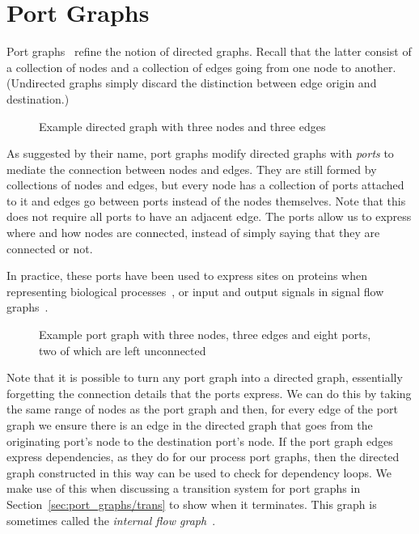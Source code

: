 \documentclass[class=smolathesis,crop=false]{standalone}
\begin{document}
\section{Port Graphs}
\label{sec:port_graphs/pg}

Port graphs~\cite{andrei_2008} refine the notion of directed graphs.
Recall that the latter consist of a collection of nodes and a collection of edges going from one node to another.
(Undirected graphs simply discard the distinction between edge origin and destination.)

\begin{figure}[htbp]
  \centering
  
  \caption{Example directed graph with three nodes and three edges}
  \label{fig:pg_intro_0}
\end{figure}

As suggested by their name, port graphs modify directed graphs with \emph{ports} to mediate the connection between nodes and edges.
They are still formed by collections of nodes and edges, but every node has a collection of ports attached to it and edges go between ports instead of the nodes themselves.
Note that this does not require all ports to have an adjacent edge.
The ports allow us to express where and how nodes are connected, instead of simply saying that they are connected or not.

In practice, these ports have been used to express sites on proteins when representing biological processes~\cite{andrei_et_al-2011}, or input and output signals in signal flow graphs~\cite{fong_spivak-2019}.

\begin{figure}[htbp]
  \centering
  
  \caption{Example port graph with three nodes, three edges and eight ports, two of which are left unconnected}
  \label{fig:pg_intro_1}
\end{figure}

Note that it is possible to turn any port graph into a directed graph, essentially forgetting the connection details that the ports express.
We can do this by taking the same range of nodes as the port graph and then, for every edge of the port graph we ensure there is an edge in the directed graph that goes from the originating port's node to the destination port's node.
If the port graph edges express dependencies, as they do for our process port graphs, then the directed graph constructed in this way can be used to check for dependency loops.
We make use of this when discussing a transition system for port graphs in Section~\ref{sec:port_graphs/trans} to show when it terminates.
This graph is sometimes called the \emph{internal flow graph}~\cite{fong_spivak-2019}.
\end{document}
